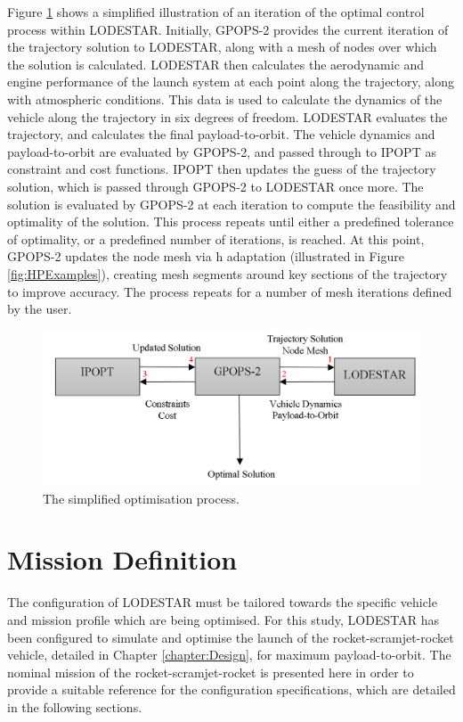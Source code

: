 Figure \ref{fig:FlowChartSmall} shows a simplified illustration of an iteration of the optimal control  process within LODESTAR. Initially, GPOPS-2 provides the current iteration of the trajectory solution to LODESTAR, along with a mesh of nodes over which the solution is calculated.
LODESTAR then calculates the aerodynamic and engine performance of the launch system at each point along the trajectory, along with atmospheric conditions. This data is used to calculate the dynamics of the vehicle along the trajectory in six degrees of freedom. LODESTAR evaluates the trajectory, and calculates the final payload-to-orbit. The vehicle dynamics and payload-to-orbit are evaluated by GPOPS-2, and passed through to IPOPT as constraint and cost functions. IPOPT then updates the guess of the trajectory solution, which is passed through GPOPS-2 to LODESTAR once more. The solution is evaluated by GPOPS-2 at each iteration to compute the feasibility and optimality of the solution. This process repeats until either a predefined tolerance of optimality, or a predefined number of iterations, is reached. At this point, GPOPS-2 updates the node mesh via \textsf{h} adaptation (illustrated in Figure \ref{fig:HPExamples}), creating mesh segments around key sections of the trajectory to improve accuracy. The process repeats for a number of mesh iterations defined by the user. 
\begin{figure}[ht]
	\centering
	\includegraphics[width=0.75\linewidth]{figures/4_LODESTAR/FlowChartSmall}
	\caption{The simplified optimisation process.}
	\label{fig:FlowChartSmall}
\end{figure}



\section{Mission Definition}\label{sec:mission}
The configuration of LODESTAR must be tailored towards the specific vehicle and mission profile which are being optimised. For this study, LODESTAR has been configured to simulate and optimise the launch of the rocket-scramjet-rocket vehicle, detailed in Chapter \ref{chapter:Design}, for maximum payload-to-orbit.
The nominal mission of the rocket-scramjet-rocket is presented here in order to provide a suitable reference for the configuration specifications, which are detailed in the following sections. 

